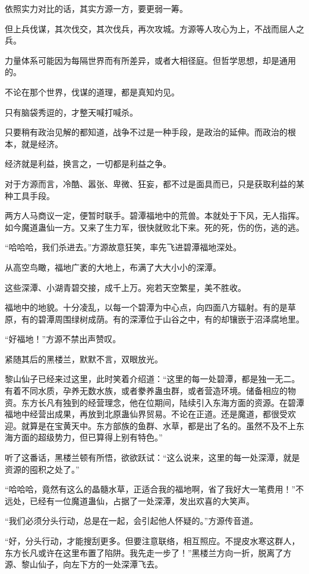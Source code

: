 \begin{this_body}
依照实力对比的话，其实方源一方，要更弱一筹。

但上兵伐谋，其次伐交，其次伐兵，再次攻城。方源等人攻心为上，不战而屈人之兵。

力量体系可能因为每隔世界而有所差异，或者大相径庭。但哲学思想，却是通用的。

不论在那个世界，伐谋的道理，都是真知灼见。

只有脑袋秀逗的，才整天喊打喊杀。

只要稍有政治见解的都知道，战争不过是一种手段，是政治的延伸。而政治的根本，就是经济。

经济就是利益，换言之，一切都是利益之争。

对于方源而言，冷酷、嚣张、卑微、狂妄，都不过是面具而已，只是获取利益的某种工具手段。

两方人马商议一定，便暂时联手。碧潭福地中的荒兽。本就处于下风，无人指挥。如今魔道蛊仙一方。又来了生力军，很快就败北下来。死的死，伤的伤，逃的逃。

“哈哈哈，我们杀进去。”方源故意狂笑，率先飞进碧潭福地深处。

从高空鸟瞰，福地广袤的大地上，布满了大大小小的深潭。

这些深潭、小湖青碧交接，成千上万。宛若天空繁星，美不胜收。

福地中的地貌。十分凌乱，以每一个碧潭为中心点，向四面八方辐射。有的是草原，有的碧潭周围绿树成荫。有的深潭位于山谷之中，有的却镶嵌于沼泽腐地里。

“好福地！”方源不禁出声赞叹。

紧随其后的黑楼兰，默默不言，双眼放光。

黎山仙子已经来过这里，此时笑着介绍道：“这里的每一处碧潭，都是独一无二。有着不同水质，孕养无数水族，或者豢养蛊虫群，或者营造环境。储备相应的物资。东方长凡有独到的经营理念，他在位期间，陆续引入东海方面的资源。在碧潭福地中经营出成果，再放到北原蛊仙界贸易。不论在正道。还是魔道，都很受欢迎。就算是在宝黄天中。东方部族的鱼群、水草，都是出了名的。虽然不及不上东海方面的超级势力，但已算得上别有特色。”

听了这番话，黑楼兰顿有所悟，欲欲跃试：“这么说来，这里的每一处深潭，就是资源的囤积之处了。”

“哈哈哈，竟然有这么的晶髓水草，正适合我的福地啊，省了我好大一笔费用！”不远处，已经有一位魔道蛊仙，占据了一处深潭，发出欢喜的大笑声。

“我们必须分头行动，总是在一起，会引起他人怀疑的。”方源传音道。

“好，分头行动，才能搜刮更多。但要注意联络，相互照应。不提皮水寒这群人，东方长凡或许在这里布置了陷阱。我先走一步了！”黑楼兰方向一折，脱离了方源、黎山仙子，向左下方的一处深潭飞去。


\end{this_body}
